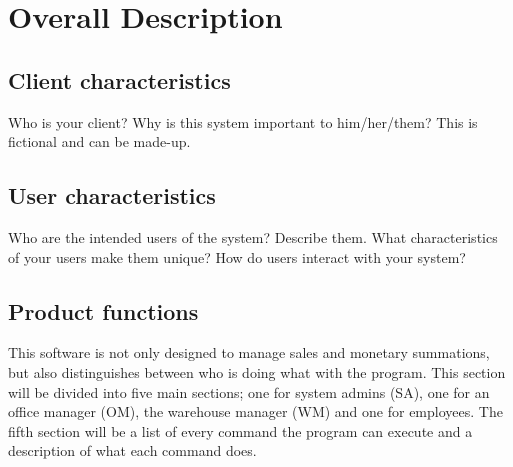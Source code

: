 \documentclass{report}
\begin{document}
\section{Overall Description}
\label{sec:desc}
\subsection{Client characteristics}
\label{sec:client}
Who is your client? Why is this system important to him/her/them? This is fictional and can be made-up.\par
\subsection{User characteristics}
\label{sec:user}
Who are the intended users of the system? Describe them. What characteristics of your users make them unique?  How do users interact with your system?\par
\subsection{Product functions}
\label{sec:functions}
This software is not only designed to manage sales and monetary summations, but also distinguishes between who is doing what with the program. This section will be divided into five main sections; one for system admins (SA), one for an office manager (OM), the warehouse manager (WM) and one for employees. The fifth section will be a list of every command the program can execute and a description of what each command does.\par
\end{document}

